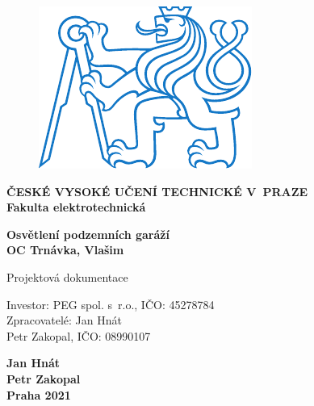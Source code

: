 \documentclass[a4paper, twoside, 11pt]{article}
\begin{document}
\begin{titlepage}
	\begin{center}

\begin{figure}[H]
	\begin{center}
		\includegraphics[scale=1]{files/symbol_cvut_konturova_verze.pdf}
	\end{center}
\end{figure}
	{\Large{\textbf{ČESKÉ VYSOKÉ UČENÍ TECHNICKÉ V~PRAZE}}}\\
	{\textbf{Fakulta elektrotechnická}}\\
	
	\vspace{3cm}
	
	
	{\Large\textbf{Osvětlení podzemních garáží}}\\
	\vspace{0.3cm}
	{\large\textbf{OC Trnávka, Vlašim}}
	\vspace{1cm}
	
	Projektová dokumentace\\
	\vspace{0.4cm}
	
	\end{center}
	
	\vspace{3cm}
	
	\noindent Investor: PEG spol. s~r.o., IČO: 45278784\\
	\noindent Zpracovatelé: Jan Hnát\\
	\hspace*{2.2cm}Petr Zakopal, IČO: 08990107
	\vspace{0.5cm}
	
	
	\vfill
	
\begin{center}

	\large{\textbf{Jan Hnát}}\\
	\large{\textbf{Petr Zakopal}}\\
	\large{\textbf{Praha 2021}}
	\end{center}
\end{titlepage}
\end{document}
